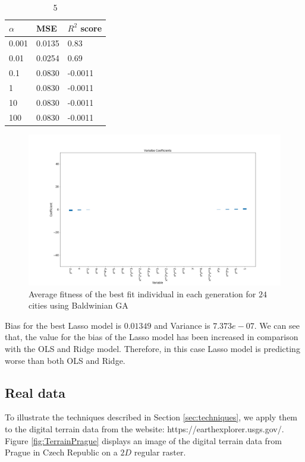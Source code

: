 \documentclass [11pt]{article}
\begin{document}
\begin{table}[H]
\centering
\begin{tabular}{lll}
\hline
$\alpha$ & MSE    & $R^{2}$ score \\ \hline
0.001     & 0.0135 & 0.83          \\
0.01      & 0.0254 & 0.69          \\
0.1       & 0.0830 & -0.0011       \\
1         & 0.0830 & -0.0011       \\
10        & 0.0830 & -0.0011       \\
100       & 0.0830 & -0.0011       \\ \hline
\end{tabular}
\caption{5}
\label{tab:LassoFranke5}
\end{table}

\begin{figure}[H]
\centering
\includegraphics[width=1\textwidth]{figures/coeffLasso.png}
        \caption{Average fitness of the best fit individual in each generation for $24$ cities using Baldwinian GA}
        \label{fig:coeffLasso}
\end{figure}

Bias for the best Lasso model is $0.01349$ and Variance is $7.373e-07$. We can see that, the value for the bias of the Lasso model has been increased in comparison with the OLS and Ridge model. Therefore, in this case Lasso model is predicting worse than both OLS and Ridge.

\subsection{Real data}
\label{sec:realdata}
To illustrate the techniques described in Section \ref{sec:techniques}, we apply them to the digital terrain data from the website: https://earthexplorer.usgs.gov/. Figure \ref{fig:TerrainPrague} displays an image of the digital terrain data from Prague in Czech Republic on a $2D$ regular raster. \\
\end{document}
